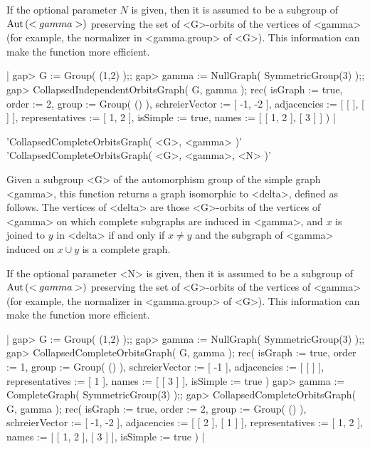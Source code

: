 If the optional  parameter  $N$  is given,  then  it is  assumed to be  a
subgroup  of  ${\rm Aut}\,(<gamma>)$ preserving  the  set  of <G>-orbits  of the
vertices of  <gamma>  (for  example,  the normalizer in  <gamma.group> of
<G>).  This information can make the function more efficient.

|    gap> G := Group( (1,2) );;
    gap> gamma := NullGraph( SymmetricGroup(3) );;
    gap> CollapsedIndependentOrbitsGraph( G, gamma );
    rec(
      isGraph := true,
      order := 2,
      group := Group( () ),
      schreierVector := [ -1, -2 ],
      adjacencies := [ [  ], [  ] ],
      representatives := [ 1, 2 ],
      isSimple := true,
      names := [ [ 1, 2 ], [ 3 ] ] ) |


'CollapsedCompleteOrbitsGraph( <G>, <gamma> )' \\
'CollapsedCompleteOrbitsGraph( <G>, <gamma>, <N> )'

Given  a  subgroup <G> of  the   automorphism  group of the simple  graph
<gamma>, this function returns a graph isomorphic  to <delta>, defined as
follows.  The vertices of <delta> are those <G>-orbits of the vertices of
<gamma> on  which complete subgraphs are  induced in <gamma>, and  $x$ is
joined to $y$ in  <delta> if and  only if $x\not=y$  and the  subgraph of
<gamma> induced on $x\cup y$ is a complete graph.

If the optional  parameter  <N>  is given, then  it is assumed  to  be  a
subgroup of  ${\rm Aut}\,(<gamma>)$  preserving  the  set of  <G>-orbits  of the
vertices  of  <gamma> (for  example,  the normalizer in  <gamma.group> of
<G>).  This information can make the function more efficient.

|    gap> G := Group( (1,2) );;
    gap> gamma := NullGraph( SymmetricGroup(3) );;
    gap> CollapsedCompleteOrbitsGraph( G, gamma );
    rec(
      isGraph := true,
      order := 1,
      group := Group( () ),
      schreierVector := [ -1 ],
      adjacencies := [ [  ] ],
      representatives := [ 1 ],
      names := [ [ 3 ] ],
      isSimple := true )
    gap> gamma := CompleteGraph( SymmetricGroup(3) );;
    gap> CollapsedCompleteOrbitsGraph( G, gamma );
    rec(
      isGraph := true,
      order := 2,
      group := Group( () ),
      schreierVector := [ -1, -2 ],
      adjacencies := [ [ 2 ], [ 1 ] ],
      representatives := [ 1, 2 ],
      names := [ [ 1, 2 ], [ 3 ] ],
      isSimple := true ) |

